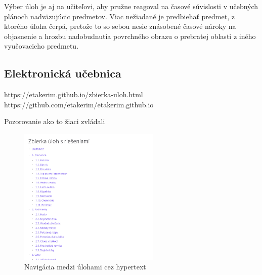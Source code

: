Výber úloh je aj na učiteľovi, aby pružne reagoval na časové súvislosti v učebných plánoch nadväzujúcic predmetov. Viac nežiadané je predbiehať predmet, z ktorého úloha čerpá, pretože to so sebou nesie znásobené časové nároky na objasnenie a hrozbu nadobudnutia povrchného obrazu o prebratej oblasti z iného vyučovacieho predmetu.

\subsection{Elektronická učebnica}
https://etakerim.github.io/zbierka-uloh.html
https://github.com/etakerim/etakerim.github.io

Pozorovanie ako to žiaci zvládali

\begin{figure}[h]
\centering
\includegraphics[width=0.6\textwidth]{assets/web-zbierka-obsah.png}
\caption{Navigácia medzi úlohami cez hypertext}
\end{figure}

